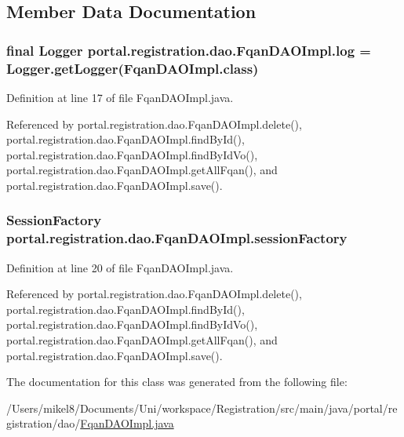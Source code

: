 \subsection{Member Data Documentation}
\hypertarget{classportal_1_1registration_1_1dao_1_1FqanDAOImpl_aa9640e5b881a23f5e86db80c4664bea1}{
\subsubsection[{log}]{\setlength{\rightskip}{0pt plus 5cm}final Logger {\bf portal.registration.dao.FqanDAOImpl.log} = Logger.getLogger(FqanDAOImpl.class)}}
\label{classportal_1_1registration_1_1dao_1_1FqanDAOImpl_aa9640e5b881a23f5e86db80c4664bea1}


Definition at line 17 of file FqanDAOImpl.java.



Referenced by portal.registration.dao.FqanDAOImpl.delete(), portal.registration.dao.FqanDAOImpl.findById(), portal.registration.dao.FqanDAOImpl.findByIdVo(), portal.registration.dao.FqanDAOImpl.getAllFqan(), and portal.registration.dao.FqanDAOImpl.save().

\hypertarget{classportal_1_1registration_1_1dao_1_1FqanDAOImpl_a0cff64d972eb00b9796b06c5141d5807}{
\subsubsection[{sessionFactory}]{\setlength{\rightskip}{0pt plus 5cm}SessionFactory {\bf portal.registration.dao.FqanDAOImpl.sessionFactory}}}
\label{classportal_1_1registration_1_1dao_1_1FqanDAOImpl_a0cff64d972eb00b9796b06c5141d5807}


Definition at line 20 of file FqanDAOImpl.java.



Referenced by portal.registration.dao.FqanDAOImpl.delete(), portal.registration.dao.FqanDAOImpl.findById(), portal.registration.dao.FqanDAOImpl.findByIdVo(), portal.registration.dao.FqanDAOImpl.getAllFqan(), and portal.registration.dao.FqanDAOImpl.save().



The documentation for this class was generated from the following file:\begin{DoxyCompactItemize}
\item 
/Users/mikel8/Documents/Uni/workspace/Registration/src/main/java/portal/registration/dao/\hyperlink{FqanDAOImpl_8java}{FqanDAOImpl.java}\end{DoxyCompactItemize}
